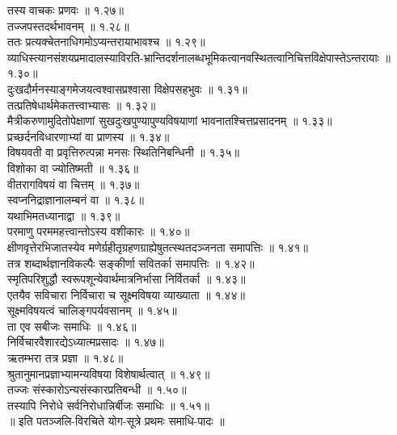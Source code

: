 \begin{multicols}{2}
\begin{flushleft}
तस्य वाचकः प्रणवः ॥ १.२७॥\\
तज्जपस्तदर्थभावनम् ॥ १.२८॥\\
ततः प्रत्यक्चेतनाधिगमोऽप्यन्तरायाभावश्च ॥ १.२९॥\\
व्याधिस्त्यानसंशयप्रमादालस्याविरति-भ्रान्तिदर्शनालब्धभूमिकत्वानवस्थितत्वानिचित्तविक्षेपास्तेऽन्तरायाः ॥ १.३०॥\\
दुःखदौर्मनस्याङ्गमेजयत्वश्वासप्रश्वासा विक्षेपसहभुवः ॥ १.३१॥\\
तत्प्रतिषेधार्थमेकतत्त्वाभ्यासः ॥ १.३२॥\\
मैत्रीकरुणामुदितोपेक्षाणां सुखदुःखपुण्यापुण्यविषयाणां भावनातश्चित्तप्रसादनम् ॥ १.३३॥\\
प्रच्छर्दनविधारणाभ्यां वा प्राणस्य ॥ १.३४॥\\
विषयवती वा प्रवृत्तिरुत्पन्ना मनसः स्थितिनिबन्धिनी ॥ १.३५॥\\
विशोका वा ज्योतिष्मती ॥ १.३६॥\\
वीतरागविषयं वा चित्तम् ॥ १.३७॥\\
स्वप्ननिद्राज्ञानालम्बनं वा ॥ १.३८॥\\
यथाभिमतध्यानाद्वा ॥ १.३९॥\\
परमाणु परममहत्त्वान्तोऽस्य वशीकारः ॥ १.४०॥\\
क्षीणवृत्तेरभिजातस्येव मणेर्ग्रहीतृग्रहणग्राह्येषुतत्स्थतदञ्जनता समापत्तिः ॥ १.४१॥\\
तत्र शब्दार्थज्ञानविकल्पैः सङ्कीर्णा सवितर्का समापत्तिः ॥ १.४२॥\\
स्मृतिपरिशुद्धौ स्वरूपशून्येवार्थमात्रनिर्भासा निर्वितर्का ॥ १.४३॥\\
एतयैव सविचारा निर्विचारा च सूक्ष्मविषया व्याख्याता ॥ १.४४॥\\
सूक्ष्मविषयत्वं चालिङ्गपर्यवसानम् ॥ १.४५॥\\
ता एव सबीजः समाधिः ॥ १.४६॥\\
निर्विचारवैशारद्येऽध्यात्मप्रसादः ॥ १.४७॥\\
ऋतम्भरा तत्र प्रज्ञा ॥ १.४८॥\\
श्रुतानुमानप्रज्ञाभ्यामन्यविषया विशेषार्थत्वात् ॥ १.४९॥\\
तज्जः संस्कारोऽन्यसंस्कारप्रतिबन्धी ॥ १.५०॥\\
तस्यापि निरोधे सर्वनिरोधान्निर्बीजः समाधिः ॥ १.५१॥\\
॥ इति पतञ्जलि-विरचिते योग-सूत्रे प्रथमः समाधि-पादः ॥\\
\end{flushleft}


\end{multicols}
